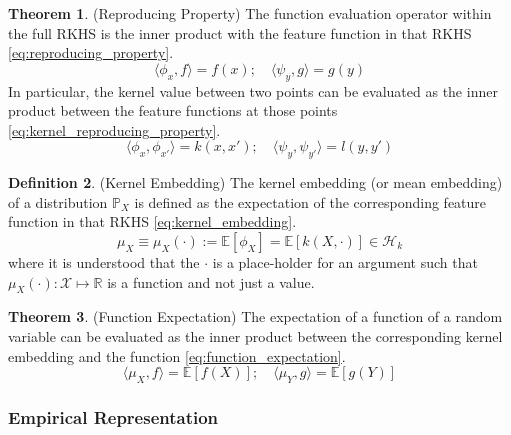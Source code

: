 \documentclass[twoside]{article} \usepackage{aistats2017}
\theoremstyle{definition}
\newtheorem{theorem}{Theorem}[section]
\newtheorem{definition}[theorem]{Definition}
\newcommand{\rv}[1]{{#1}}
\newcommand{\extra}[1]{{\color{ForestGreen} #1}}
\newcommand{\expect}[1]{{\mathbb{E}[#1]}}
\newcommand{\inner}[2]{{\langle #1, #2 \rangle}}
\newcommand{\Hk}{\mathcal{H}_{k}}
\newcommand{\muX}{\mu_{\rv{X}}}
\newcommand{\muY}{\mu_{\rv{Y}}}
\newcommand{\phiX}{\phi_{\rv{X}}}
\begin{document}
		\begin{theorem} \label{thm:reproducing_property}
			(Reproducing Property)
			The function evaluation operator within the full RKHS is the inner product with the feature function in that RKHS \eqref{eq:reproducing_property}.
			\begin{equation}
				\inner{\phi_{x}}{f} = f(x) ;\quad \inner{\psi_{y}}{g} = g(y)
			\label{eq:reproducing_property}
			\end{equation}
			\extra{
			In particular, the kernel value between two points can be evaluated as the inner product between the feature functions at those points \eqref{eq:kernel_reproducing_property}.
			\begin{equation}
				\inner{\phi_{x}}{\phi_{x'}} = k(x, x') ;\quad \inner{\psi_{y}}{\psi_{y'}} = l(y, y')
			\label{eq:kernel_reproducing_property}
			\end{equation}
			}
		\end{theorem}
		
		\begin{definition} \label{def:kernel_embedding}
			(Kernel Embedding)
			The kernel embedding (or mean embedding) of a distribution $\mathbb{P}_{\rv{X}}$ is defined as the expectation of the corresponding feature function in that RKHS \eqref{eq:kernel_embedding}.
			\begin{equation}
				\muX \equiv \muX(\cdot) := \expect{\phiX} = \expect{k(\rv{X}, \cdot)} \in \Hk
			\label{eq:kernel_embedding}
			\end{equation}
			\extra{
			where it is understood that the $\cdot$ is a place-holder for an argument such that $\muX(\cdot) : \mathcal{X} \mapsto \mathbb{R}$ is a function and not just a value.
			}
		\end{definition}
		
		\begin{theorem} \label{thm:function_expectation}
			(Function Expectation)
			The expectation of a function of a random variable can be evaluated as the inner product between the corresponding kernel embedding and the function \eqref{eq:function_expectation}.
			\begin{equation}
				\inner{\muX}{f} = \expect{f(\rv{X})} ;\quad \inner{\muY}{g} = \expect{g(\rv{Y})}
			\label{eq:function_expectation}
			\end{equation}
		\end{theorem}
		
		
		\subsubsection{Empirical Representation}
			\label{sec:background:kernel_embeddings:empirical_representation}
			
\end{document}
